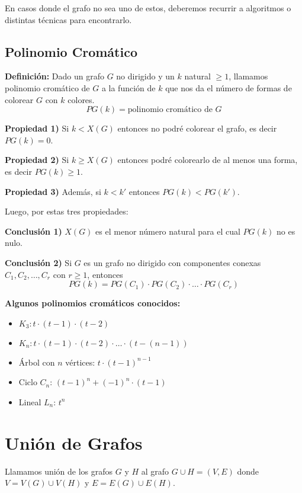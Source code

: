 \documentclass[a4paper]{article}
\newcommand{\highlight}[1]{\begin{tcolorbox}[colback=gray!10,colframe=gray!30]#1\end{tcolorbox}}
\begin{document}
En casos donde el grafo no sea uno de estos, deberemos recurrir a algoritmos o distintas técnicas para encontrarlo.

\subsection{Polinomio Cromático}

\textbf{Definición:} Dado un grafo $G$ no dirigido y un $k$ natural $\geq 1$, llamamos polinomio cromático de $G$ a la función de $k$ que nos da el número de formas de colorear $G$ con $k$ colores.
\[ PG(k) = \text{polinomio cromático de } G \]

\highlight{\textbf{Propiedad 1)} Si $k < X(G)$ entonces no podré colorear el grafo, es decir $PG(k) = 0$.}

\highlight{\textbf{Propiedad 2)} Si $k \geq X(G)$ entonces podré colorearlo de al menos una forma, es decir $PG(k) \geq 1$.}

\highlight{\textbf{Propiedad 3)} Además, si $k < k'$ entonces $PG(k) < PG(k')$.}

Luego, por estas tres propiedades:

\highlight{\textbf{Conclusión 1)} $X(G)$ es el menor número natural para el cual $PG(k)$ no es nulo.}

\highlight{\textbf{Conclusión 2)} Si $G$ es un grafo no dirigido con componentes conexas $C_1, C_2, \ldots, C_r$ con $r \geq 1$, entonces 
\[ PG(k) = PG(C_1) \cdot PG(C_2) \cdot \ldots \cdot PG(C_r) \]}

\textbf{Algunos polinomios cromáticos conocidos:}
\begin{itemize}
    \item $K_3: t \cdot (t-1) \cdot (t-2)$
    \item $K_n: t \cdot (t-1) \cdot (t-2) \cdot \ldots \cdot (t-(n-1))$
    \item Árbol con $n$ vértices: $t \cdot (t-1)^{n-1}$
    \item Ciclo $C_n$: $(t-1)^n + (-1)^n \cdot (t-1)$
    \item Lineal $L_n$: $t^n$
\end{itemize}

\section{Unión de Grafos}

Llamamos unión de los grafos $G$ y $H$ al grafo $G \cup H = (V, E)$ donde $V = V(G) \cup V(H)$ y $E = E(G) \cup E(H)$.
\end{document}
